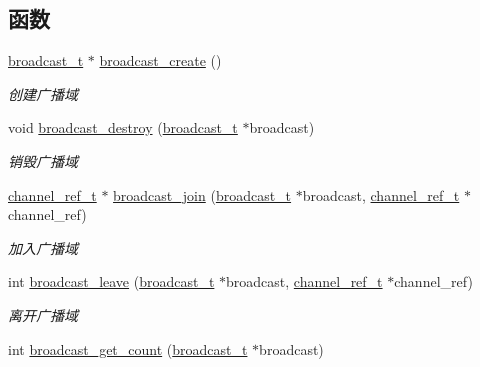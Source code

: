 \subsection*{函数}
\begin{DoxyCompactItemize}
\item 
\hyperlink{a00047_ac970c5deaf6417a866aabed01cd57b1b_ac970c5deaf6417a866aabed01cd57b1b}{broadcast\+\_\+t} $\ast$ \hyperlink{a00091_gaa3b09fb6ff3281cb10736c0aabac18fc_gaa3b09fb6ff3281cb10736c0aabac18fc}{broadcast\+\_\+create} ()
\begin{DoxyCompactList}\small\item\em 创建广播域 \end{DoxyCompactList}\item 
void \hyperlink{a00091_gaa28451fa4656633ded0c7b966ff159c3_gaa28451fa4656633ded0c7b966ff159c3}{broadcast\+\_\+destroy} (\hyperlink{a00047_ac970c5deaf6417a866aabed01cd57b1b_ac970c5deaf6417a866aabed01cd57b1b}{broadcast\+\_\+t} $\ast$broadcast)
\begin{DoxyCompactList}\small\item\em 销毁广播域 \end{DoxyCompactList}\item 
\hyperlink{a00047_a151271c9d188ef28d4d24bb81dcc1263_a151271c9d188ef28d4d24bb81dcc1263}{channel\+\_\+ref\+\_\+t} $\ast$ \hyperlink{a00091_ga1c736809a1d0e4b7c77b617ac8ce590d_ga1c736809a1d0e4b7c77b617ac8ce590d}{broadcast\+\_\+join} (\hyperlink{a00047_ac970c5deaf6417a866aabed01cd57b1b_ac970c5deaf6417a866aabed01cd57b1b}{broadcast\+\_\+t} $\ast$broadcast, \hyperlink{a00047_a151271c9d188ef28d4d24bb81dcc1263_a151271c9d188ef28d4d24bb81dcc1263}{channel\+\_\+ref\+\_\+t} $\ast$channel\+\_\+ref)
\begin{DoxyCompactList}\small\item\em 加入广播域 \end{DoxyCompactList}\item 
int \hyperlink{a00091_gad846ced37d33b750f61a88565eaed9a4_gad846ced37d33b750f61a88565eaed9a4}{broadcast\+\_\+leave} (\hyperlink{a00047_ac970c5deaf6417a866aabed01cd57b1b_ac970c5deaf6417a866aabed01cd57b1b}{broadcast\+\_\+t} $\ast$broadcast, \hyperlink{a00047_a151271c9d188ef28d4d24bb81dcc1263_a151271c9d188ef28d4d24bb81dcc1263}{channel\+\_\+ref\+\_\+t} $\ast$channel\+\_\+ref)
\begin{DoxyCompactList}\small\item\em 离开广播域 \end{DoxyCompactList}\item 
int \hyperlink{a00091_gacd045b1ca8be7fa8fac6e337934acc97_gacd045b1ca8be7fa8fac6e337934acc97}{broadcast\+\_\+get\+\_\+count} (\hyperlink{a00047_ac970c5deaf6417a866aabed01cd57b1b_ac970c5deaf6417a866aabed01cd57b1b}{broadcast\+\_\+t} $\ast$broadcast)

\end{DoxyCompactItemize}

